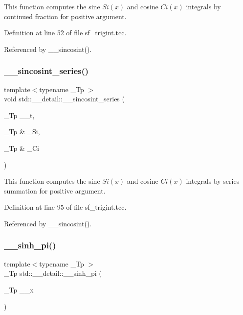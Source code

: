 This function computes the sine $ Si(x) $ and cosine $ Ci(x) $ integrals by continued fraction for positive argument. 



Definition at line 52 of file sf\+\_\+trigint.\+tcc.



Referenced by \+\_\+\+\_\+sincosint().

\mbox{\label{namespacestd_1_1____detail_aea85e0044476065ed4a067f1aa9647cb}} 
\subsubsection{\texorpdfstring{\+\_\+\+\_\+sincosint\+\_\+series()}{\_\_sincosint\_series()}}
{\footnotesize\ttfamily template$<$typename \+\_\+\+Tp $>$ \\
void std\+::\+\_\+\+\_\+detail\+::\+\_\+\+\_\+sincosint\+\_\+series (\begin{DoxyParamCaption}\item[{\+\_\+\+Tp}]{\+\_\+\+\_\+t,  }\item[{\+\_\+\+Tp \&}]{\+\_\+\+Si,  }\item[{\+\_\+\+Tp \&}]{\+\_\+\+Ci }\end{DoxyParamCaption})}



This function computes the sine $ Si(x) $ and cosine $ Ci(x) $ integrals by series summation for positive argument. 



Definition at line 95 of file sf\+\_\+trigint.\+tcc.



Referenced by \+\_\+\+\_\+sincosint().

\mbox{\label{namespacestd_1_1____detail_a6dd7153012cc7885e76a47a5162981da}} 
\subsubsection{\texorpdfstring{\+\_\+\+\_\+sinh\+\_\+pi()}{\_\_sinh\_pi()}\hspace{0.1cm}{\footnotesize\ttfamily [1/2]}}
{\footnotesize\ttfamily template$<$typename \+\_\+\+Tp $>$ \\
\+\_\+\+Tp std\+::\+\_\+\+\_\+detail\+::\+\_\+\+\_\+sinh\+\_\+pi (\begin{DoxyParamCaption}\item[{\+\_\+\+Tp}]{\+\_\+\+\_\+x }\end{DoxyParamCaption})}

